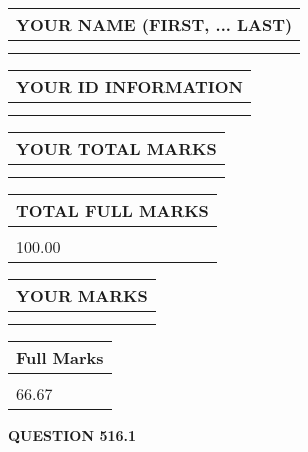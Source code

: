 \documentclass{ctexart}
\begin{document}
   
   
   
\newpage 
\setcounter{page}{ 
   516001 } 
   
   
   
   
\noindent\begin{tabular}{|l|}
\hline
YOUR NAME (FIRST, ... LAST)  \\
\hline
 \\ 
 \\ 
\hline
\end{tabular}
\hspace{0.05in} \begin{tabular}{|l|}
\hline
 YOUR   ID   INFORMATION  \\
\hline
 \\ 
 \\ 
\hline
\end{tabular}
   
   
\vspace{0.2in}\noindent\begin{tabular}{|l|}
\hline
YOUR TOTAL MARKS  \\
\hline
 \\ 
 \\ 
\hline
\end{tabular}
\hspace{0.05in} \begin{tabular}{|l|}
\hline
TOTAL FULL MARKS  \\
\hline
 \\ 
100.00 \\
\hline
\end{tabular}
   
   
 \vspace{0.2in}
 
 
 
 
   
   
  
\vspace{0.2in}
  
\noindent\begin{tabular}{|l|}
\hline
 YOUR MARKS  \\
\hline
 \\ 
 \\ 
\hline
\end{tabular}
\hspace{0.05in} \begin{tabular}{|l|}
\hline
 Full Marks  \\
\hline
 \\ 
66.67 \\
\hline
\end{tabular}
{\textbf{\Large{QUESTION
516.1 
}}}
  
\end{document}
